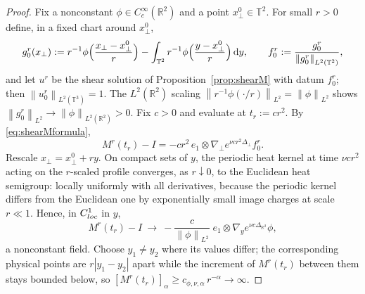 \documentclass[10pt,a4paper]{amsart}
\newcommand{\R}{\mathbb{R}}
\newcommand{\T}{\mathbb{T}}
\newcommand{\abs}[1]{\left\lvert #1\right\rvert}
\newcommand{\dd}{\,\mathrm{d}}
\newcommand{\norm}[1]{\left\lVert #1\right\rVert}
\begin{document}
\begin{proof}
Fix a nonconstant $\phi\in C_c^\infty(\R^2)$ and a point $x_\perp^0\in\T^2$. For small
$r>0$ define, in a fixed chart around $x_\perp^0$,
\[
  g^r_0(x_\perp):=r^{-1}\phi\Bigl(\frac{x_\perp-x_\perp^0}{r}\Bigr)
  -\int_{\T^2}r^{-1}\phi\Bigl(\frac{y-x_\perp^0}{r}\Bigr)\dd y,
  \qquad f^r_0:=\frac{g^r_0}{\norm{g^r_0}_{L^2(\T^2)}},
\]
and let $u^r$ be the shear solution of Proposition~\ref{prop:shearM} with datum
$f^r_0$; then $\norm{u^r_0}_{L^2(\T^3)}=1$. The $L^2(\R^2)$ scaling
$\norm{r^{-1}\phi(\cdot/r)}_{L^2}=\norm{\phi}_{L^2}$ shows
$\norm{g^r_0}_{L^2}\to\norm{\phi}_{L^2(\R^2)}>0$. Fix $c>0$ and evaluate at $t_r:=cr^2$.
By \eqref{eq:shearMformula},
\[
  M^r(t_r)-I=-c r^2\,e_1\otimes\nabla_\perp e^{\nu cr^2\Delta_\perp}f^r_0 .
\]
Rescale $x_\perp=x^0_\perp+ry$. On compact sets of $y$, the periodic heat kernel at time
$\nu cr^2$ acting on the $r$-scaled profile converges, as $r\downarrow0$, to the Euclidean
heat semigroup: locally uniformly with all derivatives, because the periodic kernel
differs from the Euclidean one by exponentially small image charges at scale
$r\ll1$. Hence, in $C^1_{\rm loc}$ in $y$,
\[
  M^r(t_r)-I\ \longrightarrow\ -\frac{c}{\norm{\phi}_{L^2}}\;e_1\otimes
  \nabla_y e^{\nu c\Delta_{\R^2}}\phi ,
\]
a nonconstant field. Choose $y_1\ne y_2$ where its values differ; the corresponding
physical points are $r\abs{y_1-y_2}$ apart while the increment of $M^r(t_r)$ between them
stays bounded below, so
$[M^r(t_r)]_{\alpha}\ge c_{\phi,\nu,\alpha}\,r^{-\alpha}\to\infty$.
\end{proof}
\end{document}
